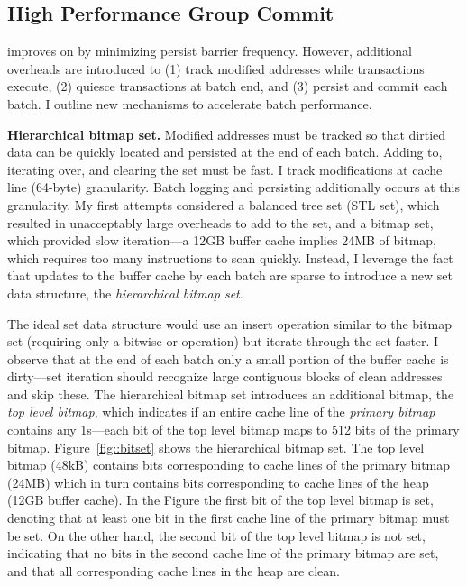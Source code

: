 \subsection{High Performance Group Commit}
\label{sec::OLTP_design:GroupCommit:Performance}

\GroupCommit improves on \InPlace by minimizing persist barrier frequency.
However, additional overheads are introduced to (1) track modified addresses while transactions execute, (2) quiesce transactions at batch end, and (3) persist and commit each batch.
I outline new mechanisms to accelerate batch performance.

\textbf{Hierarchical bitmap set.}
Modified addresses must be tracked so that dirtied data can be quickly located and persisted at the end of each batch.
Adding to, iterating over, and clearing the set must be fast.
I track modifications at cache line (64-byte) granularity.
Batch logging and persisting additionally occurs at this granularity.
My first attempts considered a balanced tree set (STL set), which resulted in unacceptably large overheads to add to the set, and a bitmap set, which provided slow iteration---a 12GB buffer cache implies 24MB of bitmap, which requires too many instructions to scan quickly.
Instead, I leverage the fact that updates to the buffer cache by each batch are sparse to introduce a new set data structure, the \emph{hierarchical bitmap set}.



The ideal set data structure would use an insert operation similar to the bitmap set (requiring only a bitwise-or operation) but iterate through the set faster.
I observe that at the end of each batch only a small portion of the buffer cache is dirty---set iteration should recognize large contiguous blocks of clean addresses and skip these.
The hierarchical bitmap set introduces an additional bitmap, the \emph{top level bitmap}, which indicates if an entire cache line of the \emph{primary bitmap} contains any 1s---each bit of the top level bitmap maps to 512 bits of the primary bitmap.
Figure~\ref{fig::bitset} shows the hierarchical bitmap set.
The top level bitmap (48kB) contains bits corresponding to cache lines of the primary bitmap (24MB) which in turn contains bits corresponding to cache lines of the heap (12GB buffer cache).
In the Figure the first bit of the top level bitmap is set, denoting that at least one bit in the first cache line of the primary bitmap must be set.
On the other hand, the second bit of the top level bitmap is not set, indicating that no bits in the second cache line of the primary bitmap are set, and that all corresponding cache lines in the heap are clean.

